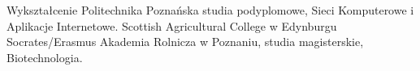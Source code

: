 \begin{rubric}{Wykształcenie}
\entry*[2010 -- 2011]Politechnika Poznańska studia podyplomowe,\newline
	Sieci Komputerowe i Aplikacje Internetowe.
\entry*[2005]Scottish Agricultural College w Edynburgu\newline
    Socrates/Erasmus
\entry*[2001 -- 2006]Akademia Rolnicza w Poznaniu, studia magisterskie,\newline
	Biotechnologia.
\end{rubric}
